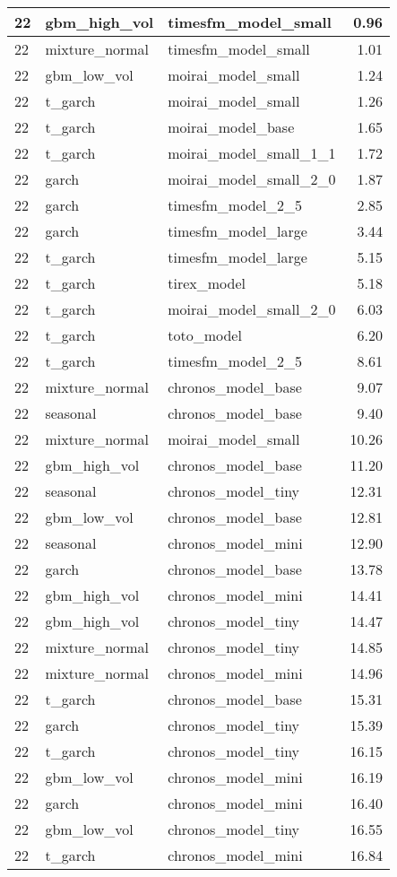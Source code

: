 {\begin{tabular}{lllr}
\midrule
22 & gbm\_high\_vol & timesfm\_model\_small & 0.96 \\
\midrule
22 & mixture\_normal & timesfm\_model\_small & 1.01 \\
\midrule
22 & gbm\_low\_vol & moirai\_model\_small & 1.24 \\
\midrule
22 & t\_garch & moirai\_model\_small & 1.26 \\
\midrule
22 & t\_garch & moirai\_model\_base & 1.65 \\
\midrule
22 & t\_garch & moirai\_model\_small\_1\_1 & 1.72 \\
\midrule
22 & garch & moirai\_model\_small\_2\_0 & 1.87 \\
\midrule
22 & garch & timesfm\_model\_2\_5 & 2.85 \\
\midrule
22 & garch & timesfm\_model\_large & 3.44 \\
\midrule
22 & t\_garch & timesfm\_model\_large & 5.15 \\
\midrule
22 & t\_garch & tirex\_model & 5.18 \\
\midrule
22 & t\_garch & moirai\_model\_small\_2\_0 & 6.03 \\
\midrule
22 & t\_garch & toto\_model & 6.20 \\
\midrule
22 & t\_garch & timesfm\_model\_2\_5 & 8.61 \\
\midrule
22 & mixture\_normal & chronos\_model\_base & 9.07 \\
\midrule
22 & seasonal & chronos\_model\_base & 9.40 \\
\midrule
22 & mixture\_normal & moirai\_model\_small & 10.26 \\
\midrule
22 & gbm\_high\_vol & chronos\_model\_base & 11.20 \\
\midrule
22 & seasonal & chronos\_model\_tiny & 12.31 \\
\midrule
22 & gbm\_low\_vol & chronos\_model\_base & 12.81 \\
\midrule
22 & seasonal & chronos\_model\_mini & 12.90 \\
\midrule
22 & garch & chronos\_model\_base & 13.78 \\
\midrule
22 & gbm\_high\_vol & chronos\_model\_mini & 14.41 \\
\midrule
22 & gbm\_high\_vol & chronos\_model\_tiny & 14.47 \\
\midrule
22 & mixture\_normal & chronos\_model\_tiny & 14.85 \\
\midrule
22 & mixture\_normal & chronos\_model\_mini & 14.96 \\
\midrule
22 & t\_garch & chronos\_model\_base & 15.31 \\
\midrule
22 & garch & chronos\_model\_tiny & 15.39 \\
\midrule
22 & t\_garch & chronos\_model\_tiny & 16.15 \\
\midrule
22 & gbm\_low\_vol & chronos\_model\_mini & 16.19 \\
\midrule
22 & garch & chronos\_model\_mini & 16.40 \\
\midrule
22 & gbm\_low\_vol & chronos\_model\_tiny & 16.55 \\
\midrule
22 & t\_garch & chronos\_model\_mini & 16.84 \\
\bottomrule
\end{tabular}
}